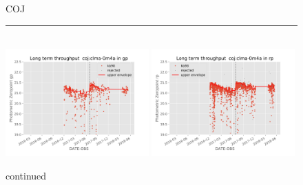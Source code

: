 \documentclass[]{spieman}
\begin{document}
\begin{figure}
COJ \\ 
\rule{\textwidth}{0.4pt} \\
\includegraphics[width=0.49\textwidth]{images/photzptrend-coj-clma-0m4a-gp.png} \hspace*{\fill}
\includegraphics[width=0.49\textwidth]{images/photzptrend-coj-clma-0m4a-rp.png} \\[1ex]
\caption {continued}
\end{figure}
\end{document}
